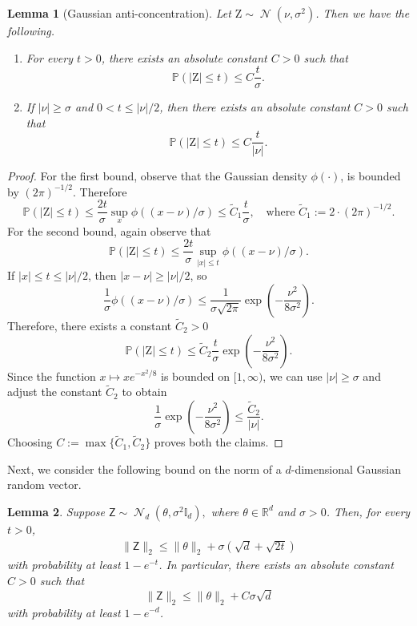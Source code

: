\documentclass[10pt]{article}
\newtheorem{lemma}{Lemma}
\newcommand{\R}{\mathbb R}
\newcommand{\Id}{\mathbb I}
\newcommand{\wt}{\widetilde}
\DeclareMathOperator{\dnorm}{\mathcal N}
\begin{document}
\begin{lemma}[Gaussian anti-concentration]
\label{lem:gaussian_anti_conc}
Let $\mathrm Z \sim \dnorm(\nu,\sigma^2)$. Then we have the following.
\begin{enumerate}
\item For every $t>0$, there exists an absolute constant $C>0$ such that
\[
    \mathbb P(|\mathrm Z|\le t) \le C\frac{t}{\sigma}.
\]

\item If $|\nu|\ge \sigma$ and $0<t\le |\nu|/2$, then there exists an absolute constant $C>0$ such that
\[
    \mathbb P(|\mathrm Z|\le t) \le C\frac{t}{|\nu|}.
\]
\end{enumerate}
\end{lemma}

\begin{proof}
For the first bound, observe that the Gaussian density $\phi(\cdot)$, is bounded by $(2\pi)^{-1/2}$. Therefore
\[
    \mathbb P(|\mathrm Z|\le t)\le \frac{2t}{\sigma} \sup_x \phi((x-\nu)/\sigma)\le \wt C_1\frac{t}{\sigma}, \quad \mbox{where $\wt C_1:=2\cdot(2\pi)^{-1/2}$.}
\]
For the second bound, again observe that 
\[
    \mathbb P(|\mathrm Z|\le t)\le \frac{2t}{\sigma} \sup_{|x| \le t} \phi((x-\nu)/\sigma).
\]
If $|x|\le t\le |\nu|/2$, then $|x-\nu|\ge |\nu|/2$, so
\[
\frac{1}{\sigma} \phi((x-\nu)/\sigma)\le\frac{1}{\sigma\sqrt{2\pi}}\exp\left(-\frac{\nu^2}{8\sigma^2}\right).
\]
Therefore, there exists a constant $\wt C_2>0$
\[
    \mathbb P(|\mathrm Z|\le t)\le
    \wt C_2\frac{t}{\sigma}
    \exp\left(-\frac{\nu^2}{8\sigma^2}\right).
\]
Since the function $x\mapsto x e^{-x^2/8}$ is bounded on $[1,\infty)$, we can use $|\nu|\ge \sigma$ and adjust the constant $\wt C_2$ to obtain 
\[
    \frac{1}{\sigma}\exp\left(-\frac{\nu^2}{8\sigma^2}\right) \le \frac{\wt C_2}{|\nu|}.
\]
Choosing $C:=\max\{\wt C_1,\wt C_2\}$ proves both the claims.
\end{proof}

Next, we consider the following bound on the norm of a $d$-dimensional Gaussian random vector.

\begin{lemma} 
\label{lem:gaussian_vector_norm} 
Suppose $\mathsf Z\sim\dnorm_d(\theta,\sigma^2\Id_d),$ where $\theta\in\R^d$ and $\sigma>0$. Then, for every $t>0$, 
\begin{align} 
\label{eq:gaussian_vector_norm} 
\|\mathsf Z\|_2 \le \|\theta\|_2 + \sigma\left(\sqrt d+\sqrt{2t}\right) 
\end{align} 
with probability at least $1-e^{-t}$. In particular, there exists an absolute constant $C>0$ such that 
\[ 
\|\mathsf Z\|_2 \le \|\theta\|_2+C\sigma\sqrt d 
\] with probability at least $1-e^{-d}$. 
\end{lemma}
\end{document}
